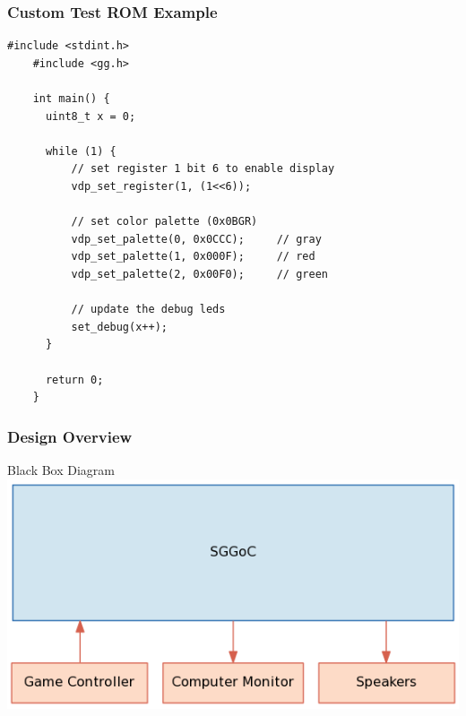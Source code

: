\documentclass[xcolor=table]{beamer}
\begin{document}
\begin{frame}[fragile]
    \frametitle{Custom Test ROM Example}
    \begin{lstlisting}[basicstyle=\ttfamily\scriptsize]
    #include <stdint.h>
    #include <gg.h>

    int main() {
      uint8_t x = 0;

      while (1) {
          // set register 1 bit 6 to enable display
          vdp_set_register(1, (1<<6));

          // set color palette (0x0BGR)
          vdp_set_palette(0, 0x0CCC);     // gray
          vdp_set_palette(1, 0x000F);     // red
          vdp_set_palette(2, 0x00F0);     // green

          // update the debug leds
          set_debug(x++);
      }

      return 0;
    }
    \end{lstlisting}
\end{frame}

\begin{frame}
    \frametitle{Design Overview}
    \vspace{-0.5\baselineskip}
    \begin{center}
        Black Box Diagram \\
        \vspace{0.5\baselineskip}
        \includegraphics[scale=0.4]{../block_diagrams/block_diagram_external.png}
    \end{center}

\end{frame}
\end{document}
